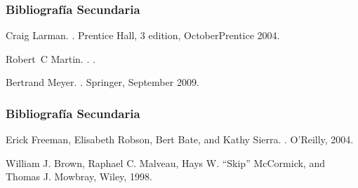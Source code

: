 \documentclass[animated,a4paper,slidestop,xcolor=pst,blue]{beamer}
\begin{document}
\begin{frame}[c]
	\frametitle{Bibliografía Secundaria}
    \begin{thebibliography}{1}


Craig Larman.
.
\newblock Prentice Hall, 3 edition, OctoberPrentice 2004.

Robert~C Martin.
.
.

Bertrand Meyer.
.
\newblock Springer, September 2009.


\end{thebibliography}
\end{frame}

\begin{frame}[c]
	\frametitle{Bibliografía Secundaria}
    \begin{thebibliography}{1}



Erick Freeman, Elisabeth Robson, Bert Bate, and Kathy Sierra.
.
\newblock O'Reilly, 2004.

William J. Brown, Raphael C. Malveau, Hays W. ``Skip'' McCormick, and Thomas J. Mowbray,
\newblock Wiley, 1998.


\end{thebibliography}
\end{frame}
\end{document}
